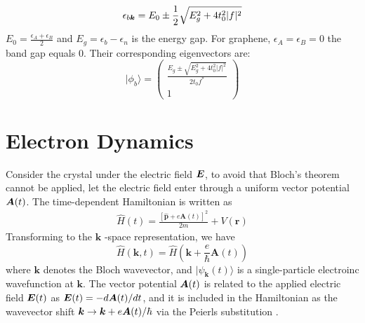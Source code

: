 \begin{equation}
\epsilon_{b\boldsymbol{k}}=E_{0} \pm \frac{1}{2} \sqrt{E_{g}^{2}+4t_{0}^{2}|f|^{2}}
\label{eigenvalues}
\end{equation}
$E_{0}=\frac{\epsilon_{A}+\epsilon_{B}}{2}$ and $E_{g}=\epsilon_{b}-\epsilon_{n}$ is the energy gap. For graphene, $\epsilon_{A} = \epsilon_{B} =0$ the band gap equals 0.
Their corresponding eigenvectors are:
\begin{equation}
    |\phi_{b}\rangle  =\left(\begin{array}{cc}
 \frac{E_{g} \pm \sqrt{E_{g}^{2}+4t_{0}^{2}|f|^{2}}}{2t_{0} f^*}\\
1
\end{array}\right)
\label{eqn:eigenvector}
\end{equation}

\section{Electron Dynamics}
Consider the crystal under the electric field $\boldsymbol {E}$, to avoid that
Bloch’s theorem cannot be applied, let the electric field enter through a uniform vector potential $\boldsymbol {A} (t)$. The time-dependent Hamiltonian is written as
\begin{align}
\hat{H}(t)=\frac{[\hat{\boldsymbol{p}}+e \boldsymbol{A}(t)]^{2}}{2 m}+V(\boldsymbol{r})
\end{align}
Transforming to the $\boldsymbol{k}$ -space representation, we have
\begin{equation}
     \hat{H}(\boldsymbol{k}, t)=\hat{H}\left(\boldsymbol{k}+\frac{e}{\hbar} \boldsymbol{A}(t)\right)
     \label{eqn:vTD}
\end{equation}
where $\boldsymbol k$ denotes the Bloch wavevector, and $|\psi_{\boldsymbol k}(t)\rangle$ is a single-particle electroinc wavefunction at $\boldsymbol k$. The vector potential $\boldsymbol A(t)$ is related to the applied electric field $\boldsymbol E(t)$ as $\boldsymbol E(t)=-d\boldsymbol A(t)/dt$, and it is included in the Hamiltonian as the wavevector shift $\boldsymbol k \rightarrow \boldsymbol k + e\boldsymbol A(t)/\hbar$ via the Peierls substitution  \cite{hofstadter1976energy}.\\
